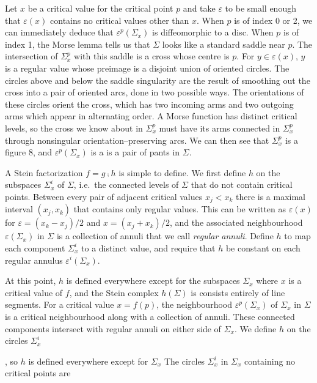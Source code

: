 Let $x$ be a critical value for the critical point $p$ and take $\varepsilon$ to be small enough that $\varepsilon(x)$ contains no critical values other than $x$.
When $p$ is of index 0 or 2, we can immediately deduce that $\varepsilon^p(\Sigma_x)$ is diffeomorphic to a disc.
When $p$ is of index 1, the Morse lemma tells us that $\Sigma$ looks like a standard saddle near $p$.
The intersection of $\Sigma_x^p$ with this saddle is a cross whose centre is $p$.
For $y\in\varepsilon(x)$, $y$ is a regular value whose preimage is a disjoint union of oriented circles.
The circles above and below the saddle singularity are the result of smoothing out the cross into a pair of oriented arcs, done in two possible ways.
The orientations of these circles orient the cross, which has two incoming arms and two outgoing arms which appear in alternating order.
A Morse function has distinct critical levels, so the cross we know about in $\Sigma_x^p$ must have its arms connected in $\Sigma_x^p$ through nonsingular orientation--preserving arcs.
We can then see that $\Sigma_x^p$ is a figure 8, and $\varepsilon^p(\Sigma_x)$ is a is a pair of pants in $\Sigma$.

A Stein factorization $f=g\comp h$ is simple to define.
We first define $h$ on the subspaces $\Sigma_x^i$ of $\Sigma$, i.e.\ the connected levels of $\Sigma$ that do not contain critical points.
Between every pair of adjacent critical values $x_j < x_k$ there is a maximal interval $(x_j,x_k)$ that contains only regular values.
This can be written as $\varepsilon(x)$ for $\varepsilon=(x_k-x_j)/2$ and $x=(x_j+x_k)/2$, and the associated neighbourhood $\varepsilon(\Sigma_x)$ in $\Sigma$ is a collection of annuli that we call \emph{regular annuli}.
Define $h$ to map each component $\Sigma_x^i$ to a distinct value, and require that $h$ be constant on each regular annulus $\varepsilon^i(\Sigma_x)$.

At this point, $h$ is defined everywhere except for the subspaces $\Sigma_x$ where $x$ is a critical value of $f$, and the Stein complex $h(\Sigma)$ is consists entirely of line segments.
For a critical value $x=f(p)$, the neighbourhood $\varepsilon^p(\Sigma_x)$ of $\Sigma_x$ in $\Sigma$ is a critical neighbourhood along with a collection of annuli.
These connected components intersect with regular annuli on either side of $\Sigma_x$.
We define $h$ on the circles $\Sigma_x^i$

, so $h$ is defined everywhere except for $\Sigma_x$
The circles $\Sigma_x^i$ in $\Sigma_x$ containing no critical points are 


